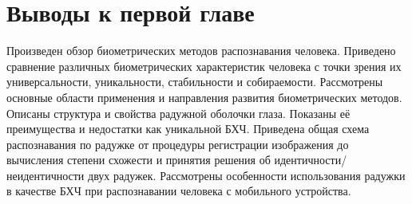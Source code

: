 \section{Выводы к первой главе}

Произведен обзор биометрических методов распознавания человека. Приведено сравнение различных биометрических характеристик человека с точки зрения их универсальности, уникальности, стабильности и собираемости. Рассмотрены основные области применения и направления развития биометрических методов. Описаны структура и свойства радужной оболочки глаза. Показаны её преимущества и недостатки как уникальной БХЧ. Приведена общая схема распознавания по радужке от процедуры регистрации изображения до вычисления степени схожести и принятия решения об идентичности/неидентичности двух радужек. Рассмотрены особенности использования радужки в качестве БХЧ при распознавании человека с мобильного устройства.
